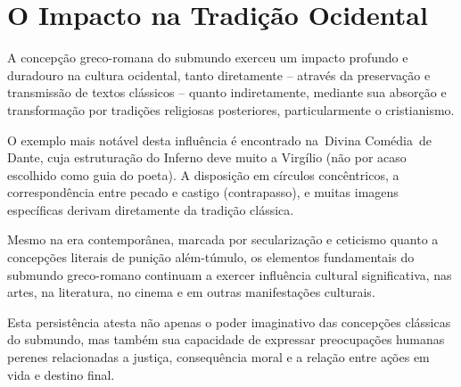 \section{O Impacto na Tradição Ocidental}

A concepção greco-romana do submundo exerceu um impacto profundo e duradouro na cultura ocidental, tanto diretamente -- através da preservação e transmissão de textos clássicos -- quanto indiretamente, mediante sua absorção e transformação por tradições religiosas posteriores, particularmente o cristianismo.

O exemplo mais notável desta influência é encontrado na Divina Comédia de Dante, cuja estruturação do Inferno deve muito a Virgílio (não por acaso escolhido como guia do poeta). A disposição em círculos concêntricos, a correspondência entre pecado e castigo (contrapasso), e muitas imagens específicas derivam diretamente da tradição clássica.

Mesmo na era contemporânea, marcada por secularização e ceticismo quanto a concepções literais de punição além-túmulo, os elementos fundamentais do submundo greco-romano continuam a exercer influência cultural significativa, nas artes, na literatura, no cinema e em outras manifestações culturais.

Esta persistência atesta não apenas o poder imaginativo das concepções clássicas do submundo, mas também sua capacidade de expressar preocupações humanas perenes relacionadas a justiça, consequência moral e a relação entre ações em vida e destino final.
